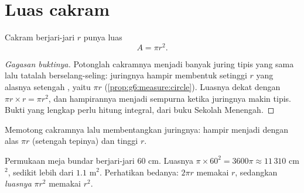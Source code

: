 \section{Luas cakram}

\begin{theorem}[Cakram]\label{thm:g7:areas:disk}
Cakram berjari-jari $r$ punya luas
\[
A = \pi r^2 .
\]
\end{theorem}

\begin{proof}[Gagasan buktinya]
Potonglah cakramnya menjadi banyak juring tipis yang sama lalu
tatalah berselang-seling: juringnya hampir membentuk 
setinggi $r$ yang alasnya setengah , yaitu $\pi r$
(\cref{prop:g6:measure:circle}). Luasnya dekat dengan
$\pi r \times r = \pi r^2$, dan hampirannya menjadi sempurna ketika
juringnya makin tipis. Bukti yang lengkap perlu hitung integral, dari
buku Sekolah Menengah.
\end{proof}

\begin{omfigure}

{\small Memotong cakramnya lalu membentangkan juringnya: hampir
menjadi  dengan alas $\pi r$ (setengah tepinya) dan tinggi $r$.}
\end{omfigure}

\begin{example}\label{ex:g7:areas:disk}
Permukaan meja bundar berjari-jari $60$ cm. Luasnya
$\pi \times 60^2 = 3600\pi \approx 11\,310$ cm$^2$, sedikit lebih dari
$1.1$ m$^2$. Perhatikan bedanya: \emph{} $2\pi r$ memakai
$r$, sedangkan \emph{luasnya} $\pi r^2$ memakai $r^2$.
\end{example}

